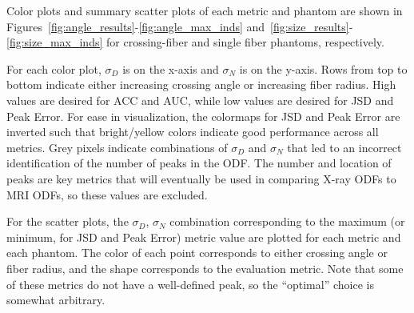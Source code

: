 \documentclass[11pt]{article}
\begin{document}
Color plots and summary scatter plots of each metric and phantom are shown in
Figures~\ref{fig:angle_results}-\ref{fig:angle_max_inds}
and~\ref{fig:size_results}-\ref{fig:size_max_inds} for crossing-fiber and single
fiber phantoms, respectively.

For each color plot, $\sigma_D$ is on the x-axis and $\sigma_N$ is on the
y-axis. Rows from top to bottom indicate either increasing crossing angle or
increasing fiber radius. High values are desired for ACC and AUC, while low
values are desired for JSD and Peak Error. For ease in visualization, the
colormaps for JSD and Peak Error are inverted such that bright/yellow colors
indicate good performance across all metrics. Grey pixels indicate combinations
of $\sigma_D$ and $\sigma_N$ that led to an incorrect identification of the
number of peaks in the ODF. The number and location of peaks are key metrics
that will eventually be used in comparing X-ray ODFs to MRI ODFs, so these
values are excluded.

For the scatter plots, the $\sigma_D$, $\sigma_N$ combination corresponding to the
maximum (or minimum, for JSD and Peak Error) metric value are plotted for each
metric and each phantom. The color of each point corresponds to either crossing
angle or fiber radius, and the shape corresponds to the evaluation metric. Note that
some of these metrics do not have a well-defined peak, so the ``optimal'' choice
is somewhat arbitrary. 
\end{document}
